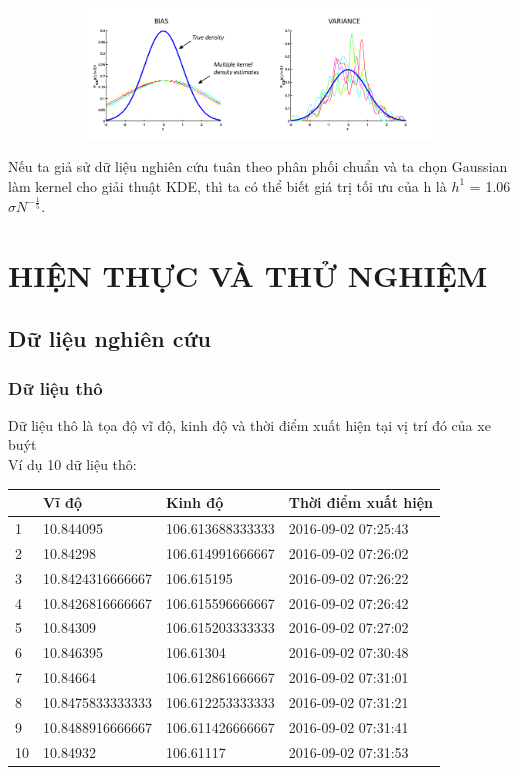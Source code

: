 \documentclass[a4paper, 13pt]{report}
\begin{document}
\FloatBarrier
\begin{figure}[!h]
  \begin{subfigure}[b]{0.5\textwidth}
	   \label{tab:example}
        \includegraphics[width=\linewidth]{KDE3}
  \end{subfigure}%
\end{figure}
\FloatBarrier
Nếu ta giả sử dữ liệu nghiên cứu tuân theo phân phối chuẩn và ta chọn Gaussian làm kernel cho giải thuật KDE, thì ta có thể biết giá trị tối ưu của h là $h^1$ = 1.06$\sigma N^{-\frac{1}{5}}$.
\chapter{HIỆN THỰC VÀ THỬ NGHIỆM}
\section{Dữ liệu nghiên cứu}
\subsection{Dữ liệu thô}
Dữ liệu thô là tọa độ vĩ độ, kinh độ và thời điểm xuất hiện tại vị trí đó của xe buýt\\
Ví dụ 10 dữ liệu thô:\\
\begin{flushleft}
\begin{tabular}{ |l|l|l|l| }
\hline
&Vĩ độ & Kinh độ & Thời điểm xuất hiện \\ 
\hline
1&10.844095 & 106.613688333333 & 2016-09-02 07:25:43 \\ 
\hline
2&10.84298 & 106.614991666667 & 2016-09-02 07:26:02 \\
\hline
3&10.8424316666667 & 106.615195 & 2016-09-02 07:26:22 \\
\hline
4&10.8426816666667 & 106.615596666667 & 2016-09-02 07:26:42 \\
\hline
5&10.84309 & 106.615203333333 & 2016-09-02 07:27:02 \\
\hline
6&10.846395 & 106.61304 & 2016-09-02 07:30:48 \\
\hline
7&10.84664 & 106.612861666667 & 2016-09-02 07:31:01 \\
\hline
8&10.8475833333333 & 106.612253333333 & 2016-09-02 07:31:21 \\
\hline
9&10.8488916666667 & 106.611426666667 & 2016-09-02 07:31:41 \\
\hline
10&10.84932 & 106.61117 & 2016-09-02 07:31:53 \\
\hline 
\end{tabular}
\end{flushleft}
\end{document}
